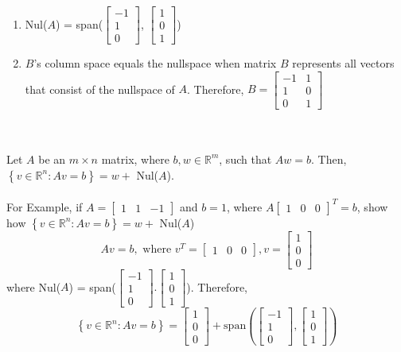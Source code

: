 \begin{enumerate}
  \item Nul($A$) = span($\begin{bmatrix} -1 \\ 1 \\ 0 \end{bmatrix}$, 
    $\begin{bmatrix} 1 \\ 0 \\ 1 \end{bmatrix}$)
  \item $B$'s column space equals the nullspace when matrix $B$ represents all vectors that consist of the 
    nullspace of $A$. Therefore, $B = \begin{bmatrix} -1 & 1 \\ 1 & 0 \\ 0 & 1 \end{bmatrix}$
\end{enumerate} \\\\
Let $A$ be an $m \times n$ matrix, where $b, w \in \mathbb{R}^m$, such that $Aw = b$. Then, 
$\left\{v \in \mathbb{R}^n : Av = b \right\} = w +$ Nul($A$). \\\\
For Example, if $A = \begin{bmatrix} 1 & 1 & -1 \end{bmatrix}$ and $b = 1$, where $A\begin{bmatrix} 1 & 0 & 0 \end{bmatrix}^T = b$, show how $\left\{v \in \mathbb{R}^n : Av = b \right\} = w +$ Nul($A$)
\[
  Av = b, \text{ where } v^T = \begin{bmatrix} 1 & 0 & 0 \end{bmatrix}, v = 
  \begin{bmatrix} 1 \\ 0 \\ 0 \end{bmatrix}
\] where Nul($A$) = span($\begin{bmatrix} -1 \\ 1 \\ 0 \end{bmatrix}. \begin{bmatrix} 1 \\ 0 \\ 1 
\end{bmatrix}$). Therefore, 
\[
  \left\{v \in \mathbb{R}^n : Av = b \right\} = \begin{bmatrix} 1 \\ 0 \\ 0 \end{bmatrix} + 
  \text{span}(\begin{bmatrix} -1 \\ 1 \\ 0 \end{bmatrix}, \begin{bmatrix} 1 \\ 0 \\ 1 \end{bmatrix})
\]
